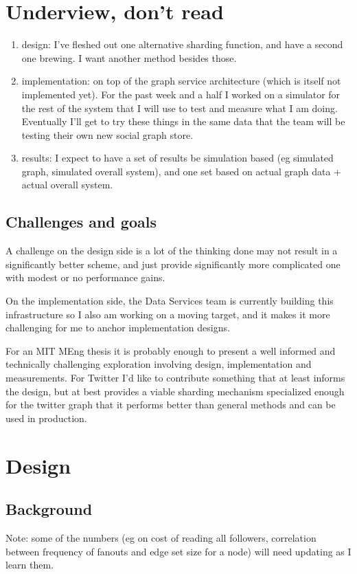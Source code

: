 \documentclass{article}
\begin{document}
\section{Underview, don't read}
\begin{enumerate}
\item design: I've fleshed out one alternative sharding function, and have a second one brewing. I want another method besides those. 

\item implementation: on top of the graph service architecture (which is itself not implemented yet). For the past week and a half I  worked on a simulator
for the rest of the system that I will use to test and measure what I am doing. Eventually I'll get to try these things in the same data that the team will be testing their own new social graph store.

\item results: I expect to have a set of results be simulation based (eg simulated graph, simulated overall system),  and one set based on actual graph data + actual overall system.
\end{enumerate}
\subsection{Challenges and goals}
A challenge on the design side is a lot of the thinking done may not result in a significantly better scheme, and just provide significantly more complicated one with modest or no performance gains. 

On the implementation side, the Data Services team is currently building this infrastructure so I also am working on a moving target, and it makes it more challenging for me to anchor implementation designs.

For an MIT MEng thesis it is probably enough to present a well informed and technically challenging exploration involving design, implementation and measurements. For Twitter I'd like to contribute something that at least informs the design, but at best provides a viable sharding mechanism specialized enough for the twitter graph that it performs better than general methods and can be used in production.

\section{Design}
\subsection{Background}
Note: some of the numbers (eg on cost of reading all followers, correlation between frequency of fanouts and edge set size for a node) will need updating as I learn them.
\end{document}
